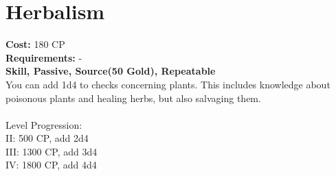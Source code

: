 \section{Herbalism}
\textbf{Cost:} 180 CP\\
\textbf{Requirements:} -\\
\textbf{Skill, Passive, Source(50 Gold), Repeatable}\\
You can add 1d4 to checks concerning plants. This includes knowledge about poisonous plants and healing herbs, but also salvaging them.\\
\\
Level Progression:\\
II: 500 CP, add 2d4\\
III: 1300 CP, add 3d4\\
IV: 1800 CP, add 4d4\\